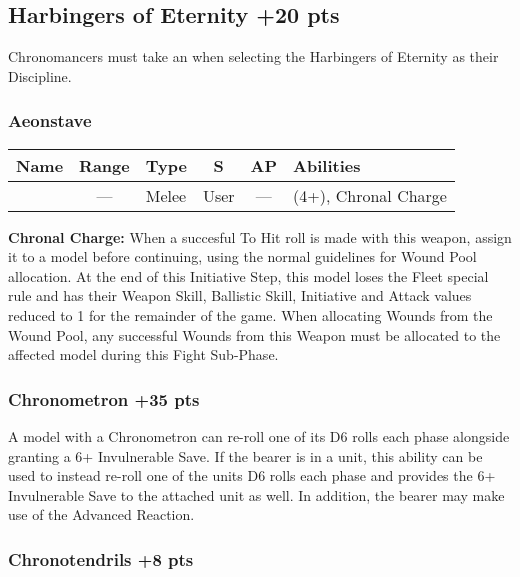 \subsection[Harbingers of Eternity ]{Harbingers of Eternity  \hrulefill +20 pts}

Chronomancers must take an  when selecting the Harbingers of Eternity as their Discipline.

\subsubsection{Aeonstave}
\label{Aeonstave}
\noindent
\begin{NiceTabular}{L{115 pt} c C{40pt} *{2}{c} >{\raggedright\arraybackslash}p{240pt}}
	Name & Range & Type & S & AP & Abilities \\
	\hline
	 & — & Melee & User & — &   (4+), Chronal Charge \\
\end{NiceTabular}

\textbf{Chronal Charge:} When a succesful To Hit roll is made with this weapon, assign it to a model before continuing, using the normal guidelines for Wound Pool allocation. At the end of this Initiative Step, this model loses the Fleet special rule and has their Weapon Skill, Ballistic Skill, Initiative and Attack values reduced to 1 for the remainder of the game. When allocating Wounds from the Wound Pool, any successful Wounds from this Weapon must be allocated to the affected model during this Fight Sub-Phase.

\subsubsection[Chronometron]{Chronometron  \hrulefill +35 pts}

A model with a Chronometron can re-roll one of its D6 rolls each phase alongside granting a 6+ Invulnerable Save. If the bearer is in a unit, this ability can be used to instead re-roll one of the units D6 rolls each phase and provides the 6+ Invulnerable Save to the attached unit as well. In addition, the bearer may make use of the  Advanced Reaction.

\subsubsection[Chronotendrils]{Chronotendrils  \hrulefill +8 pts}

